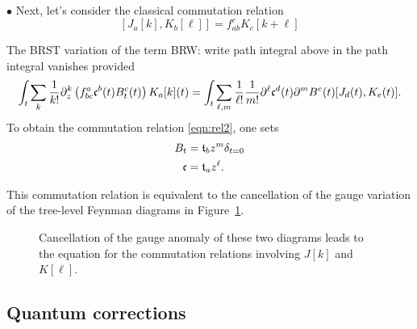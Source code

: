 \documentclass[11pt]{amsart}
\def\brian#1{{\textcolor{blue!65!red}{BRW: {#1}}}}
\begin{document}
$\bullet$
Next, let's consider the classical commutation relation 
\begin{equation}\label{eqn:rel2}
[J_a [k] , K_b [\ell]] = f_{ab}^c K_{c} [k+\ell]
\end{equation}

The BRST variation of the term \brian{write path integral above} in the path integral vanishes provided
\[
\int_t \sum_k \frac1{k!} \partial_z^k \left(f_{bc}^a \mathfrak c^b(t) B^c_t (t) \right) K_a[k] (t) = \int_t \sum_{\ell,m} \frac1{\ell!} \frac1{m!} \partial^\ell \mathfrak c^d (t) \partial^m B^e (t) [J_d (t), K_e(t)]  .
\] 
To obtain the commutation relation \eqref{eqn:rel2}, one sets 
\begin{align*}
B_t & = \mathfrak t_b z^{m} \delta_{t=0} \\
\mathfrak c & = \mathfrak t_a z^\ell .
\end{align*}

This commutation relation is equivalent to the cancellation of the gauge variation of the tree-level Feynman diagrams in Figure~\ref{fig:cancel2}.

\begin{figure}
	\caption{Cancellation of the gauge anomaly of these two diagrams leads to the equation for the commutation relations involving $J[k]$ and $K[\ell]$.
	\label{fig:cancel2}}
\end{figure}

\subsection*{Quantum corrections}
\end{document}
